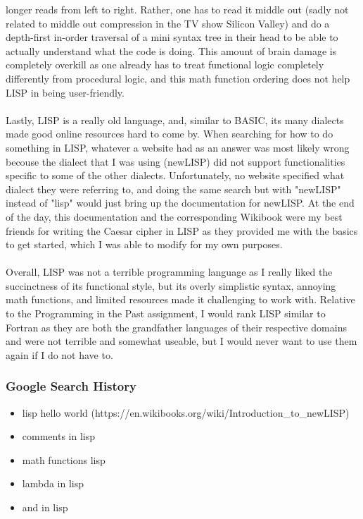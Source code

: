 \documentclass[letterpaper, 10pt, DIV=13]{scrartcl}
\numberwithin{equation}{section}
\numberwithin{figure}{section}
\numberwithin{table}{section}
\begin{document}
longer reads from left to right. Rather, one has to read it middle out (sadly not related to middle out compression in the TV show Silicon Valley) and do a depth-first
in-order traversal of a mini syntax tree in their head to be able to actually understand what the code is doing. This amount of brain damage is completely overkill as
one already has to treat functional logic completely differently from procedural logic, and this math function ordering does not help LISP in being user-friendly.
\\ \\
Lastly, LISP is a really old language, and, similar to BASIC, its many dialects made good online resources hard to come by. When searching for how to do something in LISP, 
whatever a website had as an answer was most likely wrong becouse the dialect that I was using (newLISP) did not support functionalities specific to some of the 
other dialects. Unfortunately, no website specified what dialect they were referring to, and doing the same search but with "newLISP" instead of "lisp" would 
just bring up the documentation for newLISP. At the end of the day, this documentation and the corresponding Wikibook were my best friends for writing the Caesar cipher
in LISP as they provided me with the basics to get started, which I was able to modify for my own purposes.
\\ \\
Overall, LISP was not a terrible programming language as I really liked the succinctness of its functional style, but its overly simplistic syntax, annoying math 
functions, and limited resources made it challenging to work with. Relative to the Programming in the Past assignment, I would rank LISP similar to Fortran as they are 
both the grandfather languages of their respective domains and were not terrible and somewhat useable, but I would never want to use them again if I do not have to.

\subsubsection{Google Search History}
\begin{itemize}
    \item lisp hello world (https://en.wikibooks.org/wiki/Introduction\_to\_newLISP)
    \item comments in lisp
    \item math functions lisp
    \item lambda in lisp
    \item and in lisp
\end{itemize}
\end{document}
